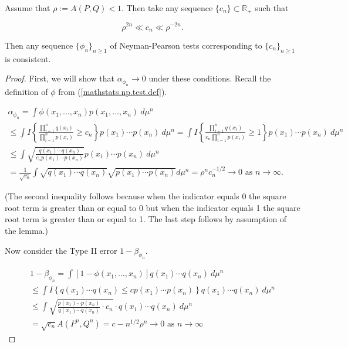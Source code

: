 \begin{theorem}

Assume that \(\rho := A(P,Q) < 1\). Then take any sequence \(\{c_n\} \subset \mathbb{R}_+\) such that 

\begin{equation}\label{mathstats.cons.np.a}
\rho^{2n} \ll c_n \ll \rho^{-2n}.
\end{equation}

Then any sequence \(\{\phi_n\}_{n \geq 1}\) of Neyman-Pearson tests corresponding to \(\{c_n\}_{n \geq 1}\) is consistent. 

\end{theorem}

\begin{proof}

First, we will show that \(\alpha_{\phi_n} \to 0\) under these conditions. Recall the definition of \(\phi\) from (\ref{mathstats.np.test.def}). 

\begin{multline*}
\alpha_{\phi_n}  = \int \phi(x_1, \ldots, x_n) p(x_1, \ldots, x_n) \ d \mu^n
 \\
\leq \int I  \left\{  \frac{ \prod_{i=1}^n q(x_i)}{ \prod_{i=1}^n p(x_i)} \geq c_n \right\} p(x_1) \cdots p(x_n)  \ d\mu^n =  \int I  \left\{  \frac{ \prod_{i=1}^n q(x_i)}{c_n \prod_{i=1}^n p(x_i)} \geq 1 \right\} p(x_1) \cdots p(x_n)  \ d\mu^n 
\\
\leq \int  \sqrt{\frac{ q(x_1) \cdots q(x_n)}{c_n p(x_1) \cdots p(x_n) } }  p(x_1) \cdots p(x_n) \ d \mu^n 
\\
= \frac{1}{\sqrt{c_n}} \int \sqrt{q(x_1) \cdots q(x_n)} \sqrt{ p(x_1) \cdots p(x_n)} d \mu^n = \rho^n c_n^{-1/2}  \to 0 \text{ as } n \to \infty.
\end{multline*}



(The second inequality follows because when the indicator equals 0 the square root term is greater than or equal to 0 but when the indicator equals 1 the square root term is greater than or equal to 1. The last step follows by assumption of the lemma.)

Now consider the Type II error \(1 - \beta_{\phi_n}\). 

\begin{multline*}
1 - \beta_{\phi_n} = \int [1 - \phi(x_1, \ldots, x_n)]q(x_1) \cdots q(x_n) \ d\mu^n \\
\leq \int I \left\{q(x_1) \cdots q(x_n) \leq c p(x_1) \cdots p(x_n) \right\} q(x_1) \cdots q(x_n) \ d\mu^n \\
\leq  \int  \sqrt{\frac{ p(x_1) \cdots p(x_n)}{q(x_1) \cdots q(x_n) }  \cdot c_n  }  \cdot q(x_1) \cdots q(x_n) \ d \mu^n  \\
= \sqrt{c_n} A(P^n, Q^n) = c-n^{1/2} \rho^n \to 0 \text{ as } n \to \infty
\end{multline*}

\end{proof}

